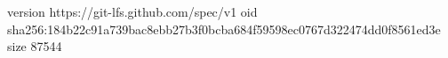 version https://git-lfs.github.com/spec/v1
oid sha256:184b22c91a739bac8ebb27b3f0bcba684f59598ec0767d322474dd0f8561ed3e
size 87544
